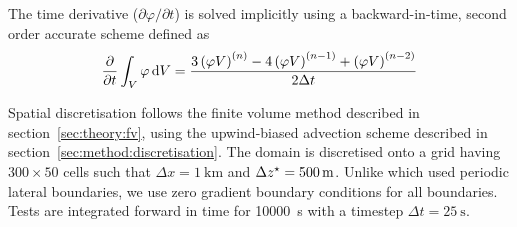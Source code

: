 The time derivative ($\partial \varphi / \partial t$) is solved implicitly using a backward-in-time, second order accurate scheme defined as \autocite{openfoam-progguide}
\begin{align}
	\frac{\partial}{\partial t} \int_V \varphi \mathop{}\!\mathrm{d} V = \frac{
		3 \left( \varphi V \right)^{(n)} - 
		4 \left( \varphi V \right)^{(n-1)} + 
		\left( \varphi V \right)^{(n-2)}
	}{2 \Delta t}
\end{align}

Spatial discretisation follows the finite volume method described in section~\ref{sec:theory:fv}, using the upwind-biased advection scheme described in section~\ref{sec:method:discretisation}.
The domain is discretised onto a grid having $300 \times 50$ cells such that $\Delta x = \SI{1}{\kilo\meter}$ and $\Delta {z^\star} = \SI{500}{\meter}$.  Unlike \textcite{schaer2002} which used periodic lateral boundaries, we use zero gradient boundary conditions for all boundaries. 
Tests are integrated forward in time for \SI{10000}{\second} with a timestep $\Delta t = \SI{25}{\second}$.  

